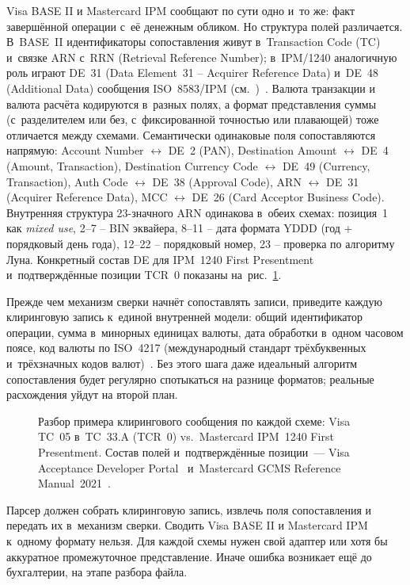 Visa BASE II и Mastercard IPM сообщают по сути одно и~то же: факт
завершённой операции с~её денежным обликом. Но структура полей
различается. В~BASE~II идентификаторы сопоставления живут
в~Transaction Code (TC) и~связке ARN с~RRN (Retrieval Reference Number);
в~IPM/1240 аналогичную роль играют DE~31 (Data Element~31 -- Acquirer
Reference Data) и~DE~48 (Additional Data) сообщения ISO~8583/IPM
(см.~\cite{iso-8583-2023})~\cite{visa-core-rules,mc-tpr}.
Валюта транзакции и валюта расчёта кодируются в~разных полях, а
формат представления суммы (с~разделителем или без, с~фиксированной
точностью или плавающей) тоже отличается между схемами.
Семантически одинаковые поля сопоставляются напрямую: Account Number $\leftrightarrow$ DE~2 (PAN), Destination Amount $\leftrightarrow$ DE~4 (Amount, Transaction), Destination Currency Code $\leftrightarrow$ DE~49 (Currency, Transaction), Auth Code $\leftrightarrow$ DE~38 (Approval Code), ARN $\leftrightarrow$ DE~31 (Acquirer Reference Data), MCC $\leftrightarrow$ DE~26 (Card Acceptor Business Code). Внутренняя структура 23-значного ARN одинакова в~обеих схемах: позиция~1 как \textit{mixed use}, 2--7 -- BIN эквайера, 8--11 -- дата формата YDDD (год + порядковый день года), 12--22 -- порядковый номер, 23 -- проверка по алгоритму Луна. Конкретный состав DE для IPM~1240 First Presentment и~подтверждённые позиции TCR~0 показаны на~рис.~\ref{fig:base2-vs-ipm}.

Прежде чем механизм сверки начнёт сопоставлять записи, приведите каждую
клиринговую запись к~единой внутренней модели: общий идентификатор операции,
сумма в~минорных единицах валюты, дата обработки в~одном часовом
поясе, код валюты по ISO~4217 (международный стандарт трёхбуквенных
и~трёхзначных кодов валют)~\cite{iso-4217}. Без этого шага даже идеальный алгоритм
сопоставления будет регулярно спотыкаться на разнице форматов;
реальные расхождения уйдут на второй план.

\begin{figure}[tbp]
  \centering
  \caption{Разбор примера клирингового сообщения по каждой схеме: Visa TC~05 в~TC~33.A (TCR~0) vs.\ Mastercard IPM~1240 First Presentment. Состав полей и~подтверждённые позиции~--- Visa Acceptance Developer Portal~\cite{visa-acceptance-capture-spec} и~Mastercard GCMS Reference Manual~2021~\cite{mc-gcms-rm-2021}.}\label{fig:base2-vs-ipm}
\end{figure}

Парсер должен собрать клиринговую запись, извлечь поля сопоставления
и передать их в~механизм сверки. Сводить Visa BASE II и Mastercard IPM
к~одному формату нельзя. Для каждой схемы нужен свой адаптер или
хотя бы аккуратное промежуточное представление. Иначе ошибка возникает ещё до
бухгалтерии, на этапе разбора файла.

